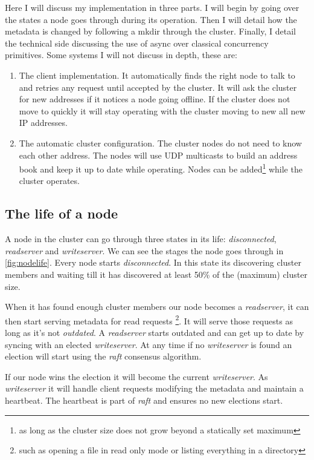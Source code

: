 Here I will discuss my implementation in three parts. I will begin by going over the states a node goes through during its operation. Then I will detail how the metadata is changed by following a mkdir through the cluster. Finally, I detail the technical side discussing the use of async over classical concurrency primitives.
Some systems I will not discuss in depth, these are:

\begin{enumerate}
	\item The client implementation. It automatically finds the right node to talk to and retries any request until accepted by the cluster. It will ask the cluster for new addresses if it notices a node going offline. If the cluster does not move to quickly it will stay operating with the cluster moving to new all new IP addresses.
	\item The automatic cluster configuration. The cluster nodes do not need to know each other address. The nodes will use UDP multicasts to build an address book and keep it up to date while operating. Nodes can be added\footnote{as long as the cluster size does not grow beyond a statically set maximum} while the cluster operates.
\end{enumerate}

\subsection{The life of a node}
A node in the cluster can go through three states in its life: \textit{disconnected}, \textit{readserver} and \textit{writeserver}. We can see the stages the node goes through in \cref{fig:nodelife}. Every node starts \textit{disconnected}. In this state its discovering cluster members and waiting till it has discovered at least 50\% of the (maximum) cluster size. 

When it has found enough cluster members our node becomes a \textit{readserver}, it can then start serving metadata for read requests \footnote{such as opening a file in read only mode or listing everything in a directory}. It will serve those requests as long as it's not \textit{outdated}. A \textit{readserver} starts outdated and can get up to date by syncing with an elected \textit{writeserver}. At any time if no \textit{writeserver} is found an election will start using the \textit{raft}\cite{raft} consensus algorithm. 

If our node wins the election it will become the current \textit{writeserver}. As \textit{writeserver} it will handle client requests modifying the metadata and maintain a heartbeat. The heartbeat is part of \textit{raft} and ensures no new elections start.

